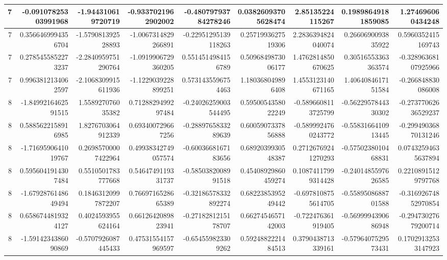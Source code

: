 \documentclass{jlreq}
\numberwithin{equation}{section}
\begin{document}
\begin{table}[H]
{\begin{tabular}{|r|r|r|r|r|r|r|r|r|}
      7 & -0.09107825303991968  & -1.944310619720719    & -0.9337021962902002  & -0.48079793784278246 & 0.03826093705628474   & 2.85135224115267      & 0.19898649181859085   & 1.274696060434248     \\ \hline
      7 & 0.3566469994356704    & -1.579081392528893    & -1.0067314829266891  & -0.22951295139118263 & 0.2571993627519306    & 2.2836394824040074    & 0.2660690093835922    & 0.5960352415169743    \\ \hline
      7 & 0.2785455852273237    & -2.2840959751290764   & -1.0919906729360205  & 0.5514514984156789   & 0.5096849873006177    & 1.4762814850670625    & 0.30516553363363574   & -0.32896368107925966  \\ \hline
      7 & 0.9963812134062597    & -2.1068309915611936   & -1.1229039228899251  & 0.5731435596754463   & 1.180368049896408     & 1.4553123140671165    & 1.4064084617151584    & -0.266848830086008    \\ \hline
      8 & -1.8499216462591515   & 1.558927076035382     & 0.7128829499297484   & -0.24026259003544495 & 0.5950054358022249    & -0.5896608113725799   & -0.5622957844330302   & -0.27377062636529237  \\ \hline
      8 & 0.5885622158916985    & 1.8276703064912339    & 0.693400729667256    & -0.2889765833289639  & 0.6005907337856888    & -0.5899924760243772   & -0.5583166410913445   & -0.29949036870131246  \\ \hline
      8 & -1.7169590641019767   & 0.26985700007422964   & 0.49938342749057574  & -0.6003668167183656  & 0.6892039930548387    & 0.27126769241270293   & -0.5750238010468831   & 0.07432594635637894   \\ \hline
      8 & 0.5956041914307484    & 0.5510501783777668    & 0.5464749119331737   & -0.5850382008991518  & 0.45408929860459274   & 0.10874117999314428   & -0.2401485597626585   & 0.22108915129797768   \\ \hline
      8 & -1.6792876148649494   & 0.18463120997872207   & 0.7669716528665389   & -0.32186578332892274 & 0.6822385395249442    & -0.6978108755614705   & -0.5589508688701588   & -0.31692674852970854  \\ \hline
      8 & 0.6586744819324127    & 0.4024593955624164    & 0.6612642089823941   & -0.2718281215178707  & 0.6627454657142003    & -0.722476361919405    & -0.5699994390686948   & -0.29473027679200714  \\ \hline
      8 & -1.5914234386090869   & -0.5707926087445433   & 0.47531554157969597  & -0.654559823309262   & 0.5924882221484513    & 0.3790438713339161    & -0.5796407529573431   & 0.17029132533147923   \\ \hline

\end{tabular}}
\end{table}
\end{document}
